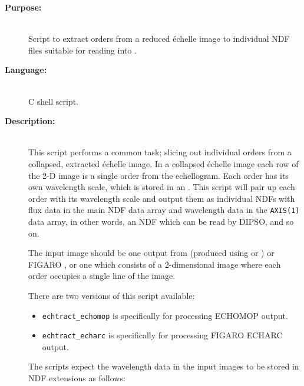 \documentclass[twoside,11pt]{starlink}
\begin{document}
\begin{description}

\item [\textbf{Purpose:}] \mbox{} \\
     Script to extract orders from a reduced \'{e}chelle image to
     individual NDF files suitable for reading into .

\item [\textbf{Language:}] \mbox{} \\
     C shell script.

\item [\textbf{Description:}] \mbox{} \\
     This script performs a common task; slicing out individual orders
     from a collapsed, extracted \'{e}chelle image.  In a collapsed \'{e}chelle
     image each row of the 2-D image is a single order from the
     echellogram.   Each order has its own wavelength scale, which is
     stored in an  .
     This script will pair up each order
     with its wavelength scale and output them as individual NDFs with
     flux data in the main NDF data array and wavelength data in the
     \verb+AXIS(1)+ data array, in other words, an NDF which can be read
     by DIPSO,  and so on.

     The input image should be one output from 
     (produced using  or
     ) or FIGARO
     , or one which consists of a
     2-dimensional image where each order occupies a single line of the
     image.

     There are two versions of this script available:

\begin{itemize}

\item \verb+echtract_echomop+ is specifically for processing ECHOMOP
      output.

\item \verb+echtract_echarc+ is specifically for processing FIGARO ECHARC
      output.

\end{itemize}

     The scripts expect the wavelength data in the input images to be stored
     in NDF extensions as follows:

\begin{itemize}


\end{itemize}
\end{description}
\end{document}
